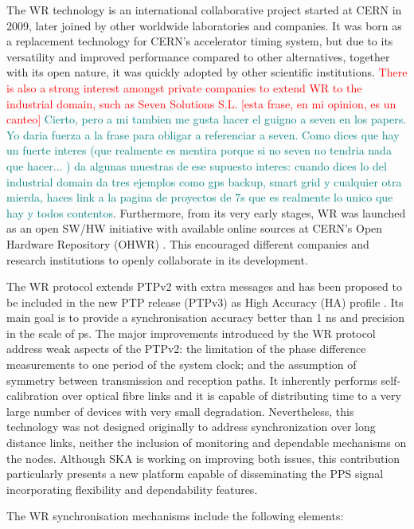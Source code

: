 The WR technology \cite{Wlostowski2011} is an international collaborative
project started at CERN in 2009, later joined by other worldwide laboratories and companies. It was born as a replacement technology for CERN's accelerator timing system, but due to its versatility and improved performance compared to other alternatives, together with its open nature, it was quickly adopted by other scientific institutions. \textcolor{red}{There is also a strong interest amongst private companies to extend WR to the industrial domain, such as Seven Solutions S.L. \cite{sevensols:wr} [esta frase, en mi opinion, es un canteo]} 
\textcolor{teal}{Cierto, pero a mi tambien me gusta hacer el guigno a seven en 
los papers. Yo daria fuerza a la frase para obligar a referenciar a seven. Como 
dices que hay un fuerte interes (que realmente es mentira porque si no seven no 
tendria nada que hacer... ) da algunas muestras de ese supuesto interes: cuando 
dices lo del industrial domain da tres ejemplos como gps backup, smart grid y 
cualquier otra mierda, haces link a la pagina de proyectos de 7s que es 
realmente lo unico que hay y todos contentos}. 
Furthermore, from its very early stages, WR was launched as an open SW/HW
initiative with available online sources at CERN's Open Hardware Repository (OHWR) \cite{ohwr:repo}. This encouraged different companies and research institutions to openly collaborate in its development.

The WR protocol extends PTPv2 with extra messages and has been proposed to be
included in the new PTP release (PTPv3) as High Accuracy (HA) profile
\cite{wr:maciej-ptpv3-standard} . Its main goal is to provide a synchronisation
accuracy better than 1 ns and precision in the scale of ps. The major
improvements introduced by the WR protocol address weak aspects of the PTPv2:
the limitation of the phase difference measurements to one period of the system
clock; and the assumption of symmetry between transmission and reception
paths. It inherently performs self-calibration over optical fibre links and it
is capable of distributing time to a very large number of devices with very
small degradation. Nevertheless, this technology was not designed originally
to address synchronization over long distance links, neither the inclusion of monitoring and dependable mechanisms on the nodes. Although SKA is working on improving both issues, this contribution particularly presents a new platform capable of disseminating the PPS signal incorporating flexibility and dependability features. 

The WR synchronisation mechanisms include the following elements:

